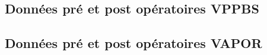 \newpage

\subsection{Données pré et post opératoires VPPBS }
\newpage


\subsection{Données pré et post opératoires VAPOR}
\newpage